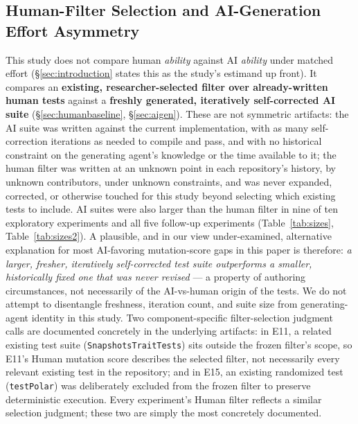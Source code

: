 \documentclass[10pt,conference]{IEEEtran}
\begin{document}
\subsection{Human-Filter Selection and AI-Generation Effort Asymmetry}
\label{sec:effortasymmetry}
This study does not compare human \emph{ability} against AI \emph{ability} under matched effort (\S\ref{sec:introduction} states this as the study's estimand up front). It compares an \textbf{existing, researcher-selected filter over already-written human tests} against a \textbf{freshly generated, iteratively self-corrected AI suite} (\S\ref{sec:humanbaseline}, \S\ref{sec:aigen}). These are not symmetric artifacts: the AI suite was written against the current implementation, with as many self-correction iterations as needed to compile and pass, and with no historical constraint on the generating agent's knowledge or the time available to it; the human filter was written at an unknown point in each repository's history, by unknown contributors, under unknown constraints, and was never expanded, corrected, or otherwise touched for this study beyond selecting which existing tests to include. AI suites were also larger than the human filter in nine of ten exploratory experiments and all five follow-up experiments (Table~\ref{tab:sizes}, Table~\ref{tab:sizes2}). A plausible, and in our view under-examined, alternative explanation for most AI-favoring mutation-score gaps in this paper is therefore: \emph{a larger, fresher, iteratively self-corrected test suite outperforms a smaller, historically fixed one that was never revised} — a property of authoring circumstances, not necessarily of the AI-vs-human origin of the tests. We do not attempt to disentangle freshness, iteration count, and suite size from generating-agent identity in this study. Two component-specific filter-selection judgment calls are documented concretely in the underlying artifacts: in E11, a related existing test suite (\texttt{SnapshotsTraitTests}) sits outside the frozen filter's scope, so E11's Human mutation score describes the selected filter, not necessarily every relevant existing test in the repository; and in E15, an existing randomized test (\texttt{testPolar}) was deliberately excluded from the frozen filter to preserve deterministic execution. Every experiment's Human filter reflects a similar selection judgment; these two are simply the most concretely documented.
\end{document}
